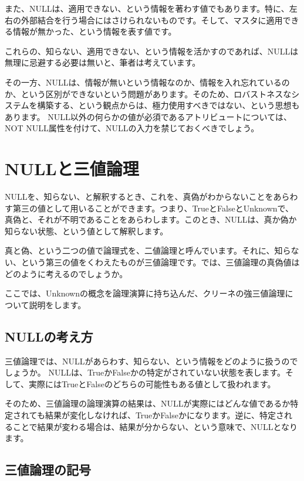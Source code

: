 また、NULLは、適用できない、という情報を著わす値でもあります。特に、左右の外部結合を行う場合にはさけられないものです。そして、マスタに適用できる情報が無かった、という情報を表す値です。

これらの、知らない、適用できない、という情報を活かすのであれば、NULLは無理に忌避する必要は無いと、筆者は考えています。

その一方、NULLは、情報が無いという情報なのか、情報を入れ忘れているのか、という区別ができないという問題があります。そのため、ロバストネスなシステムを構築する、という観点からは、極力使用すべきではない、という思想もあります。
NULL以外の何らかの値が必須であるアトリビュートについては、NOT NULL属性を付けて、NULLの入力を禁じておくべきでしょう。



\section{NULLと三値論理}

NULLを、知らない、と解釈するとき、これを、真偽がわからないことをあらわす第三の値として用いることができます。つまり、TrueとFalseとUnknownで、真偽と、それが不明であることをあらわします。このとき、NULLは、真か偽か知らない状態、という値として解釈します。

真と偽、という二つの値で論理式を、二値論理と呼んでいます。それに、知らない、という第三の値をくわえたものが三値論理です。では、三値論理の真偽値はどのように考えるのでしょうか。

ここでは、Unknownの概念を論理演算に持ち込んだ、クリーネの強三値論理について説明をします。

\subsection{NULLの考え方}

三値論理では、NULLがあらわす、知らない、という情報をどのように扱うのでしょうか。
NULLは、TrueかFalseかの特定がされていない状態を表します。そして、実際にはTrueとFalseのどちらの可能性もある値として扱われます。

そのため、三値論理の論理演算の結果は、NULLが実際にはどんな値であるか特定されても結果が変化しなければ、TrueかFalseかになります。逆に、特定されることで結果が変わる場合は、結果が分からない、という意味で、NULLとなります。



\subsection{三値論理の記号}

